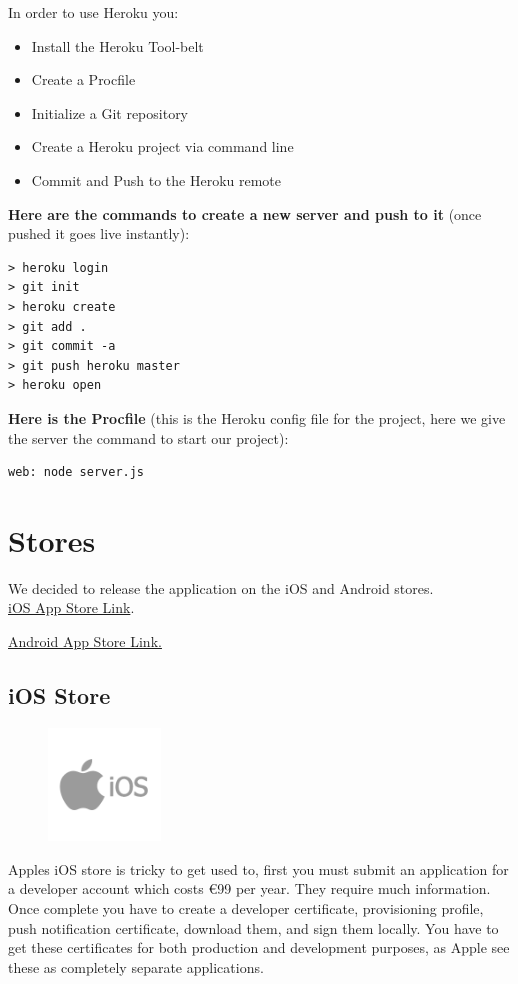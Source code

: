 In order to use Heroku you:
\begin{itemize}
	\item Install the Heroku Tool-belt
	\item Create a Procfile
	\item Initialize a Git repository
	\item Create a Heroku project via command line
	\item Commit and Push to the Heroku remote
\end{itemize}

\textbf{Here are the commands to create a new server and push to it} (once pushed it goes live instantly):
\begin{verbatim}
> heroku login
> git init
> heroku create
> git add .
> git commit -a
> git push heroku master
> heroku open
\end{verbatim}

\textbf{Here is the Procfile} (this is the Heroku config file for the project, here we give the server the command to start our project):
\begin{verbatim}
web: node server.js
\end{verbatim}

\section{Stores}
We decided to release the application on the iOS and Android stores.
\\

\href{https://itunes.apple.com/ie/app/gmit-catering/id1054850061?mt=8}{iOS App Store Link}.

\href{https://play.google.com/store/apps/details?id=ie.gmit.catering}{Android App Store Link.}

\subsection{iOS Store}
\begin{figure}
	\includegraphics[width=3cm]{img/mobile-app/logos/ios.png}
\end{figure} 
Apples iOS store \cite{ios} is tricky to get used to, first you must submit an application for a developer account which costs €99 per year. They require much information. Once complete you have to create a developer certificate, provisioning profile, push notification certificate, download them, and sign them locally. You have to get these certificates for both production and development purposes, as Apple see these as completely separate applications.
\\

